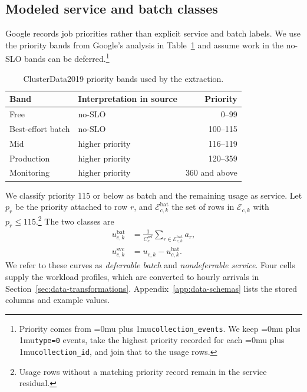 \documentclass[conference]{IEEEtran}
\newcommand{\codepath}[1]{{\Urlmuskip=0mu plus 1mu\relax\nolinkurl{#1}}}
\begin{document}
\subsection{Modeled service and batch classes}
\label{subsec:clusterdata-tier-split}

Google records job priorities rather than explicit service and batch
labels. We use the priority bands from Google's analysis in
Table~\ref{tab:priority-bands} and assume work in the no-SLO bands can be
deferred.\footnote{Priority comes from \codepath{collection_events}. We keep
\codepath{type=0} events, take the highest priority recorded for each
\codepath{collection_id}, and join that to the usage rows.}

\begin{table}[htbp]
  \centering
  \footnotesize
  \caption{ClusterData2019 priority bands used by the extraction.}
  \label{tab:priority-bands}
  \begin{tabular}{@{}llr@{}}
    \toprule
    Band & Interpretation in source & Priority \\
    \midrule
    Free & no-SLO & 0--99 \\
    Best-effort batch & no-SLO & 100--115 \\
    Mid & higher priority & 116--119 \\
    Production & higher priority & 120--359 \\
    Monitoring & higher priority & 360 and above \\
    \bottomrule
  \end{tabular}
\end{table}

We classify priority 115 or below as batch and the remaining usage as
service. Let \(p_r\) be the priority attached to row \(r\), and
\(\mathcal{E}^{\mathrm{bat}}_{c,k}\) the set of rows in
\(\mathcal{E}_{c,k}\) with \(p_r\leq115\).\footnote{Usage rows without a
matching priority record remain in the service residual.} The two classes are
\begin{align}
  u^{\mathrm{bat}}_{c,k}
  &=
  \frac{1}{C^{\mathrm{ref}}_c}
  \sum_{r\in\mathcal{E}^{\mathrm{bat}}_{c,k}} a_r,
  \label{eq:batch-utilization}\\
  u^{\mathrm{svc}}_{c,k}
  &=
  u_{c,k}-u^{\mathrm{bat}}_{c,k}.
  \label{eq:service-utilization}
\end{align}
We refer to these curves as \emph{deferrable batch} and
\emph{nondeferrable service}. Four cells supply the workload profiles, which
are converted to hourly arrivals in Section~\ref{sec:data-transformations}.
Appendix~\ref{app:data-schemas} lists the stored columns and example values.
\end{document}

